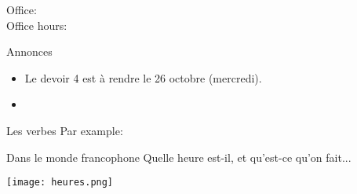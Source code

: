 \documentclass{beamer}
\subtitle[Heures et verbes \lexi{-ir}]{Les heures et les verbes \lexi{-ir}}
\begin{document}
  \begin{frame}
    \titlepage
    \tiny{Office: \\
          Office hours: }
  \end{frame}

  \begin{frame}{Annonces}
    \begin{itemize}
      \item Le devoir 4 est à rendre le 26 octobre (mercredi).
      \item[] 
    \end{itemize}
  \end{frame}

  \begin{frame}{Les verbes }
    Par example:
    \begin{center}
      
    \end{center}
  \end{frame}

  \begin{frame}{Dans le monde francophone}
    Quelle heure est-il, et qu'est-ce qu'on fait...
    \begin{center}
      \texttt{[image: heures.png]}
    \end{center}
  \end{frame}
\end{document}
